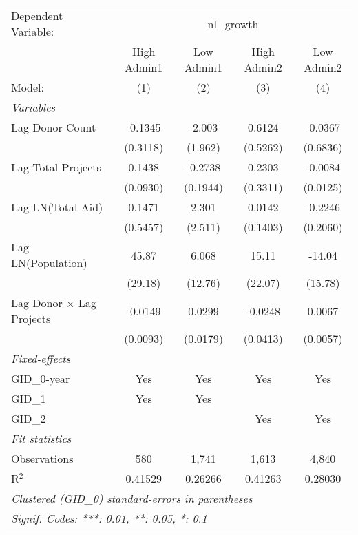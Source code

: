 
\begingroup
\centering
\begin{tabular}{lcccc}
   \tabularnewline \midrule \midrule
   Dependent Variable: & \multicolumn{4}{c}{nl\_growth}\\
                            & High Admin1 & Low Admin1 & High Admin2 & Low Admin2 \\   
   Model:                   & (1)         & (2)        & (3)         & (4)\\  
   \midrule
   \emph{Variables}\\
   Lag Donor Count          & -0.1345     & -2.003     & 0.6124      & -0.0367\\   
                            & (0.3118)    & (1.962)    & (0.5262)    & (0.6836)\\   
   Lag Total Projects       & 0.1438      & -0.2738    & 0.2303      & -0.0084\\   
                            & (0.0930)    & (0.1944)   & (0.3311)    & (0.0125)\\   
   Lag LN(Total Aid)        & 0.1471      & 2.301      & 0.0142      & -0.2246\\   
                            & (0.5457)    & (2.511)    & (0.1403)    & (0.2060)\\   
   Lag LN(Population)       & 45.87       & 6.068      & 15.11       & -14.04\\   
                            & (29.18)     & (12.76)    & (22.07)     & (15.78)\\   
   Lag Donor × Lag Projects & -0.0149     & 0.0299     & -0.0248     & 0.0067\\   
                            & (0.0093)    & (0.0179)   & (0.0413)    & (0.0057)\\   
   \midrule
   \emph{Fixed-effects}\\
   GID\_0-year              & Yes         & Yes        & Yes         & Yes\\  
   GID\_1                   & Yes         & Yes        &             & \\  
   GID\_2                   &             &            & Yes         & Yes\\  
   \midrule
   \emph{Fit statistics}\\
   Observations             & 580         & 1,741      & 1,613       & 4,840\\  
   R$^2$                    & 0.41529     & 0.26266    & 0.41263     & 0.28030\\  
   \midrule \midrule
   \multicolumn{5}{l}{\emph{Clustered (GID\_0) standard-errors in parentheses}}\\
   \multicolumn{5}{l}{\emph{Signif. Codes: ***: 0.01, **: 0.05, *: 0.1}}\\
\end{tabular}
\par\endgroup


